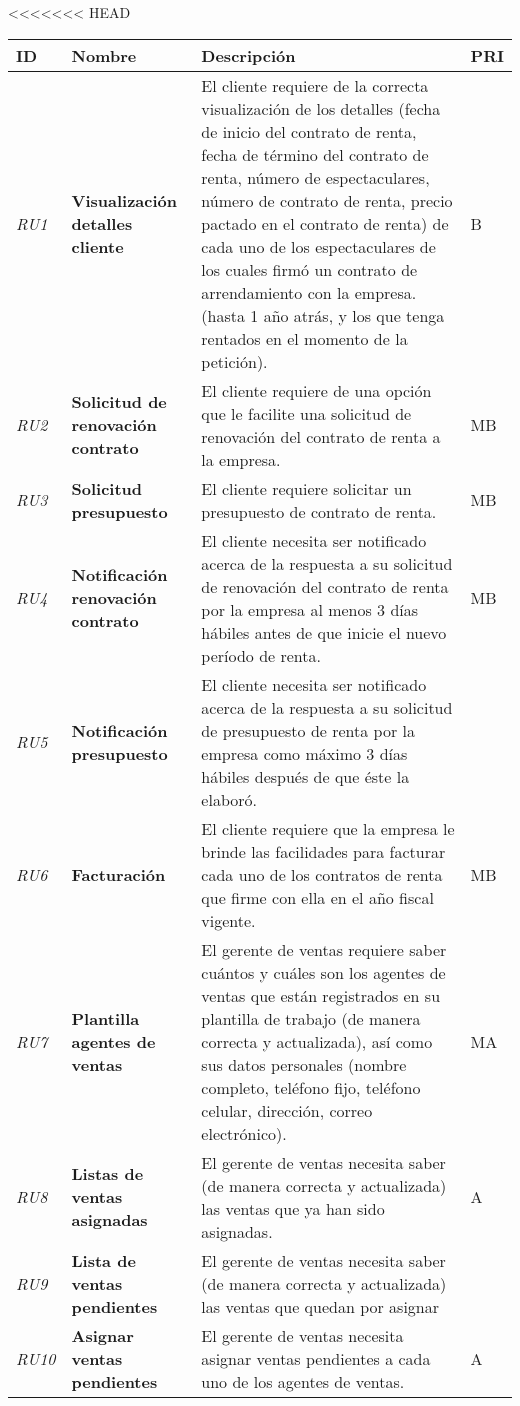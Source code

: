 <<<<<<< HEAD
\begin{longtable}[H]{m{2cm}m{3cm}m{5cm}m{2cm}}
\toprule
\centering \textbf{ID} & \centering  \textbf{Nombre} & \centering \textbf{Descripción} & \centering \textbf{PRI} \tabularnewline
\midrule
\textit{RU1} &\textbf{Visualización detalles cliente} & El cliente requiere de la correcta visualización de los detalles (fecha de inicio del contrato de renta, fecha de término del contrato de renta, número de espectaculares, número de contrato de renta, precio pactado en el contrato de renta) de cada uno de los espectaculares  de los cuales firmó un contrato de arrendamiento con la empresa. (hasta 1 año atrás, y los que  tenga rentados en el momento de la petición). & B\tabularnewline
\textit{RU2} &\textbf{Solicitud de renovación contrato} & El cliente requiere de una opción que le facilite una solicitud de renovación del contrato de renta a la empresa. & MB\tabularnewline
\textit{RU3} &\textbf{Solicitud presupuesto} & El cliente requiere solicitar un presupuesto de contrato de renta. & MB\tabularnewline
\textit{RU4} &\textbf{Notificación renovación contrato} & El cliente necesita ser notificado acerca de la respuesta a su solicitud de renovación del contrato de renta por la empresa al menos 3 días hábiles antes de  que inicie el nuevo período de renta. & MB\tabularnewline
\textit{RU5} &\textbf{Notificación presupuesto} & El cliente necesita ser notificado acerca de la respuesta  a su solicitud de presupuesto de renta por la empresa como máximo 3 días hábiles después de que éste la elaboró. &\tabularnewline
\textit{RU6} &\textbf{Facturación} & El cliente requiere que la empresa le brinde las facilidades para facturar cada uno de los contratos de renta que firme con ella en el año fiscal vigente. & MB\tabularnewline
\textit{RU7} &\textbf{Plantilla agentes de ventas} & El gerente de ventas requiere saber cuántos y cuáles son los agentes de ventas que están registrados en su plantilla de trabajo (de manera correcta y actualizada), así como sus datos personales (nombre completo, teléfono fijo, teléfono celular, dirección, correo electrónico). & MA\tabularnewline
\textit{RU8} &\textbf{Listas de ventas asignadas} & El gerente de ventas necesita saber (de manera correcta y actualizada) las ventas que ya han sido asignadas. & A\tabularnewline
\textit{RU9} &\textbf{Lista de ventas pendientes} & El gerente de ventas necesita saber (de manera correcta y actualizada) las ventas que quedan por asignar &\tabularnewline
\textit{RU10} &\textbf{Asignar ventas pendientes} & El gerente de ventas necesita asignar ventas pendientes a cada uno de los agentes de ventas. & A\tabularnewline

\end{longtable}
